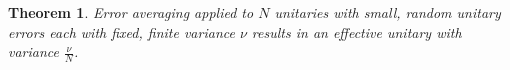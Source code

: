 \documentclass[aps,pra,twocolumn,superscriptaddress,numerical]{revtex4-1}
\newtheorem{theorem}{Theorem}
\begin{document}
%
%
%

\begin{theorem} \label{Theorem 2}
Error averaging applied to $N$ unitaries with small, random unitary errors each with fixed, finite variance $\nu$ results in an effective unitary with variance $\frac{\nu}{N}$.
\end{theorem}
\end{document}
